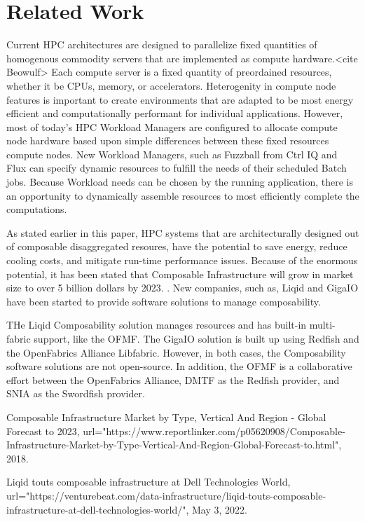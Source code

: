 \section{Related Work}
Current HPC architectures are designed to parallelize fixed quantities of homogenous commodity servers that are implemented as compute hardware.<cite Beowulf>  Each compute server is a fixed quantity of preordained resources, whether it be CPUs, memory, or accelerators.  Heterogenity in compute node features is important to create environments that are adapted to be most energy efficient and computationally performant for individual applications.  However, most of today's HPC Workload Managers are configured to allocate compute node hardware based upon simple differences between these fixed resources compute nodes.  New Workload Managers, such as Fuzzball from Ctrl IQ \cite{fuzzball} and Flux \cite{flux} can specify dynamic resources to fulfill the needs of their scheduled Batch jobs.  Because Workload needs can be chosen by the running application, there is an opportunity to dynamically assemble resources to most efficiently complete the computations.
 
As stated earlier in this paper, HPC systems that are architecturally designed out of composable disaggregated resoures, have the potential to save energy, reduce cooling costs, and mitigate run-time performance issues.  Because of the enormous potential, it has been stated that Composable Infrastructure will grow in market size to over 5 billion dollars by 2023. \cite{reportlinker}. New companies, such as, Liqid \cite{liqid} and GigaIO \cite{gigaio} have been started to provide software solutions to manage composability.  

THe Liqid Composability solution manages resources and has built-in multi-fabric support, like the OFMF.  The GigaIO solution is built up using Redfish and the OpenFabrics Alliance Libfabric.  However, in both cases, the Composability software solutions are not open-source.  In addition, the OFMF is a collaborative effort between the OpenFabrics Alliance, DMTF as the Redfish provider, and SNIA as the Swordfish provider.

  Composable Infrastructure Market by Type, Vertical And Region - Global Forecast to 2023,
  url="https://www.reportlinker.com/p05620908/Composable-Infrastructure-Market-by-Type-Vertical-And-Region-Global-Forecast-to.html",
  2018.
  
  Liqid touts composable infrastructure at Dell Technologies World,
  url="https://venturebeat.com/data-infrastructure/liqid-touts-composable-infrastructure-at-dell-technologies-world/",
  May 3, 2022.
  
